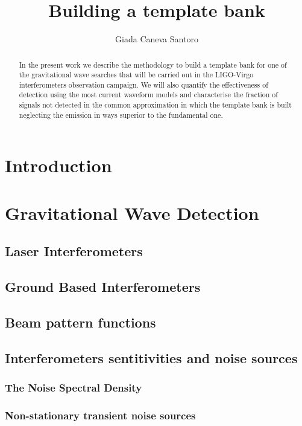 \documentclass[binding=0.6cm, LaM]{sapthesis}
\title{Building a template bank}
\author{Giada Caneva Santoro}
\begin{document}
\frontmatter
\maketitle
\dedication{Fortsett å gå.}

\begin{abstract}
In the present work we describe the methodology to build a template bank for one of the gravitational wave searches that will be carried out in the LIGO-Virgo interferometers observation campaign. 
We will also quantify the effectiveness of detection using the most current waveform models and characterise the fraction of signals not detected in the common approximation in which the template 
bank is built neglecting the emission in ways superior to the fundamental one.
\end{abstract}

\tableofcontents

\mainmatter 




\chapter{Introduction}
\chapter{Gravitational Wave Detection}
\section{Laser Interferometers}
\section{Ground Based Interferometers}
\section{Beam pattern functions}
\section{Interferometers sentitivities and noise sources}
\subsection{The Noise Spectral Density}
\subsection{Non-stationary transient noise sources}
\end{document}
